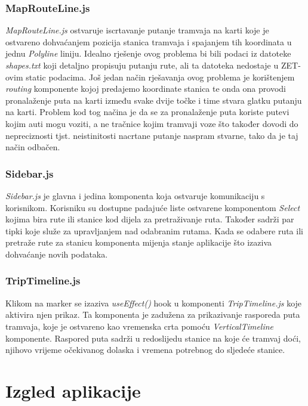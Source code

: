 \documentclass[zavrsnirad]{fer}
\begin{document}
\subsubsection{MapRouteLine.js}
\textit{MapRouteLine.js} ostvaruje iscrtavanje putanje tramvaja na karti koje je ostvareno dohvaćanjem pozicija stanica tramvaja i spajanjem tih koordinata u jednu \textit{Polyline} liniju. Idealno rješenje ovog problema bi bili podaci iz datoteke \textit{shapes.txt} koji detaljno propisuju putanju rute, ali ta datoteka nedostaje u ZET-ovim static podacima.
Još jedan način rješavanja ovog problema je korištenjem \textit{routing} komponente kojoj predajemo koordinate stanica te onda ona provodi pronalaženje puta na karti između svake dvije točke i time stvara glatku putanju na karti. Problem kod tog načina je da se za pronalaženje puta koriste putevi kojim auti mogu voziti, a ne tračnice kojim tramvaji voze što također dovodi do nepreciznosti tjst. neistinitosti nacrtane putanje naspram stvarne, tako da je taj način odbačen.

\subsubsection{Sidebar.js}
\textit{Sidebar.js} je glavna i jedina komponenta koja ostvaruje komunikaciju s korisnikom. Korisniku su dostupne padajuće liste ostvarene komponentom \textit{Select} kojima bira rute ili stanice kod dijela za pretraživanje ruta. Također sadrži par tipki koje služe za upravljanjem nad odabranim rutama. Kada se odabere ruta ili pretraže rute za stanicu komponenta mijenja stanje aplikacije što izaziva dohvaćanje novih podataka.

\subsubsection{TripTimeline.js}
Klikom na marker se izaziva \textit{useEffect()} hook u komponenti \textit{TripTimeline.js} koje aktivira njen prikaz. Ta komponenta je zadužena za prikazivanje rasporeda puta tramvaja, koje je ostvareno kao vremenska crta pomoću \textit{VerticalTimeline} komponente. Raspored puta sadrži u redoslijedu stanice na koje će tramvaj doći, njihovo vrijeme očekivanog dolaska i vremena potrebnog do sljedeće stanice.

\section{Izgled aplikacije}
\end{document}

